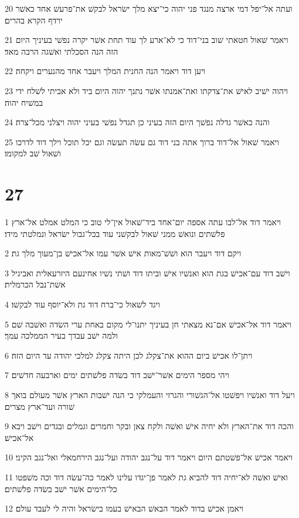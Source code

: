 \par 20 ועתה אל־יפל דמי ארצה מנגד פני יהוה כי־יצא מלך ישׂראל לבקשׁ את־פרעשׁ אחד כאשׁר ירדף הקרא בהרים׃
\par 21 ויאמר שׁאול חטאתי שׁוב בני־דוד כי לא־ארע לך עוד תחת אשׁר יקרה נפשׁי בעיניך היום הזה הנה הסכלתי ואשׁגה הרבה מאד׃
\par 22 ויען דוד ויאמר הנה החנית המלך ויעבר אחד מהנערים ויקחה׃
\par 23 ויהוה ישׁיב לאישׁ את־צדקתו ואת־אמנתו אשׁר נתנך יהוה היום ביד ולא אביתי לשׁלח ידי במשׁיח יהוה׃
\par 24 והנה כאשׁר גדלה נפשׁך היום הזה בעיני כן תגדל נפשׁי בעיני יהוה ויצלני מכל־צרה׃
\par 25 ויאמר שׁאול אל־דוד ברוך אתה בני דוד גם עשׂה תעשׂה וגם יכל תוכל וילך דוד לדרכו ושׁאול שׁב למקומו׃

\chapter{27}

\par 1 ויאמר דוד אל־לבו עתה אספה יום־אחד ביד־שׁאול אין־לי טוב כי המלט אמלט אל־ארץ פלשׁתים ונואשׁ ממני שׁאול לבקשׁני עוד בכל־גבול ישׂראל ונמלטתי מידו׃
\par 2 ויקם דוד ויעבר הוא ושׁשׁ־מאות אישׁ אשׁר עמו אל־אכישׁ בן־מעוך מלך גת׃
\par 3 וישׁב דוד עם־אכישׁ בגת הוא ואנשׁיו אישׁ וביתו דוד ושׁתי נשׁיו אחינעם היזרעאלית ואביגיל אשׁת־נבל הכרמלית׃
\par 4 ויגד לשׁאול כי־ברח דוד גת ולא־יוסף עוד לבקשׁו׃
\par 5 ויאמר דוד אל־אכישׁ אם־נא מצאתי חן בעיניך יתנו־לי מקום באחת ערי השׂדה ואשׁבה שׁם ולמה ישׁב עבדך בעיר הממלכה עמך׃
\par 6 ויתן־לו אכישׁ ביום ההוא את־צקלג לכן היתה צקלג למלכי יהודה עד היום הזה׃
\par 7 ויהי מספר הימים אשׁר־ישׁב דוד בשׂדה פלשׁתים ימים וארבעה חדשׁים׃
\par 8 ויעל דוד ואנשׁיו ויפשׁטו אל־הגשׁורי והגרזי והעמלקי כי הנה ישׁבות הארץ אשׁר מעולם בואך שׁורה ועד־ארץ מצרים׃
\par 9 והכה דוד את־הארץ ולא יחיה אישׁ ואשׁה ולקח צאן ובקר וחמרים וגמלים ובגדים וישׁב ויבא אל־אכישׁ׃
\par 10 ויאמר אכישׁ אל־פשׁטתם היום ויאמר דוד על־נגב יהודה ועל־נגב הירחמאלי ואל־נגב הקיני׃
\par 11 ואישׁ ואשׁה לא־יחיה דוד להביא גת לאמר פן־יגדו עלינו לאמר כה־עשׂה דוד וכה משׁפטו כל־הימים אשׁר ישׁב בשׂדה פלשׁתים׃
\par 12 ויאמן אכישׁ בדוד לאמר הבאשׁ הבאישׁ בעמו בישׂראל והיה לי לעבד עולם׃

